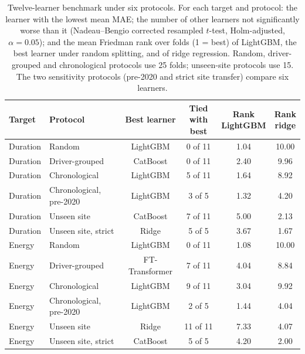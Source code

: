 \begin{table}[!tbp]
\centering\footnotesize
\caption{Twelve-learner benchmark under six protocols. For each target and protocol: the learner with the lowest mean MAE; the number of other learners not significantly worse than it (Nadeau--Bengio corrected resampled $t$-test, Holm-adjusted, $\alpha=0.05$); and the mean Friedman rank over folds (1 = best) of LightGBM, the best learner under random splitting, and of ridge regression. Random, driver-grouped and chronological protocols use 25 folds; unseen-site protocols use 15. The two sensitivity protocols (pre-2020 and strict site transfer) compare six learners.}
\label{tab:benchmark}
\begin{adjustbox}{max width=\textwidth}
\begin{tabular}{llcccc}
\toprule
Target & Protocol & Best learner & \makecell{Tied with\\best} & \makecell{Rank\\LightGBM} & \makecell{Rank\\ridge} \\
\midrule
Duration & Random & LightGBM & 0 of 11 & 1.04 & 10.00 \\
Duration & Driver-grouped & CatBoost & 0 of 11 & 2.40 & 9.96 \\
Duration & Chronological & LightGBM & 5 of 11 & 1.64 & 8.92 \\
Duration & Chronological, pre-2020 & LightGBM & 3 of 5 & 1.32 & 4.20 \\
Duration & Unseen site & CatBoost & 7 of 11 & 5.00 & 2.13 \\
Duration & Unseen site, strict & Ridge & 5 of 5 & 3.67 & 1.67 \\
Energy & Random & LightGBM & 0 of 11 & 1.08 & 10.00 \\
Energy & Driver-grouped & FT-Transformer & 7 of 11 & 4.04 & 8.84 \\
Energy & Chronological & LightGBM & 9 of 11 & 3.04 & 9.92 \\
Energy & Chronological, pre-2020 & LightGBM & 2 of 5 & 1.44 & 4.04 \\
Energy & Unseen site & Ridge & 11 of 11 & 7.33 & 4.07 \\
Energy & Unseen site, strict & CatBoost & 5 of 5 & 4.20 & 2.00 \\
\bottomrule
\end{tabular}
\end{adjustbox}
\end{table}
